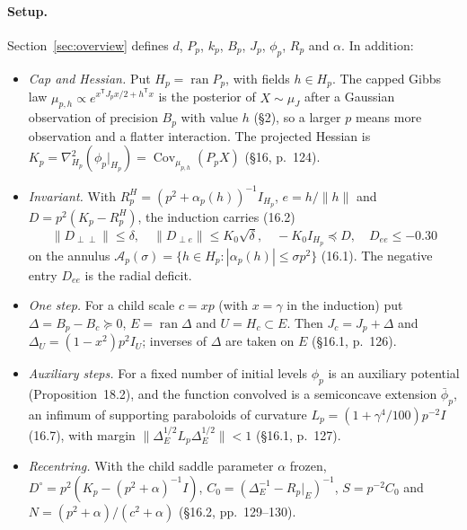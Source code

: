 \documentclass[11pt]{article}
\DeclareMathOperator{\Cov}{Cov}
\DeclareMathOperator{\ran}{ran}
\newcommand{\norm}[1]{\lVert #1\rVert}
\newcommand{\ploc}[2]{#1}
\begin{document}
\paragraph{Setup.}
Section~\ref{sec:overview} defines $d$, $P_p$, $k_p$, $B_p$, $J_p$,
$\phi_p$, $R_p$ and $\alpha$. In addition:
\begin{itemize}
\item \emph{Cap and Hessian.} Put $H_p=\ran P_p$, with fields $h\in H_p$. The
capped Gibbs law $\mu_{p,h}\propto e^{x^{\mathsf T}J_px/2+h^{\mathsf T}x}$ is
the posterior of $X\sim\mu_J$ after a Gaussian observation of precision
$B_p$ with value $h$ \ploc{(\S2)}{model.tex:29--41}, so a larger $p$ means
more observation and a flatter interaction. The projected Hessian is
$K_p=\nabla^2_{H_p}(\phi_p|_{H_p})=\Cov_{\mu_{p,h}}(P_pX)$
\ploc{(\S16, p.~124)}{cap-multiscale.tex:17--23}.
\item \emph{Invariant.} With $R_p^H=(p^2+\alpha_p(h))^{-1}I_{H_p}$,
$e=h/\norm h$ and $D=p^2(K_p-R_p^H)$, the induction carries
\ploc{(16.2)}{cap-multiscale.tex:40--45}
\[
 \norm{D_{\perp\perp}}\le\delta,\quad
 \norm{D_{\perp e}}\le K_0\sqrt\delta,\quad
 -K_0I_{H_p}\preceq D,\quad D_{ee}\le-0.30
\]
on the annulus $\mathcal A_p(\sigma)=\{h\in H_p:|\alpha_p(h)|\le\sigma p^2\}$
\ploc{(16.1)}{cap-multiscale.tex:8--12}. The negative entry $D_{ee}$ is the
radial deficit.
\item \emph{One step.} For a child scale $c=xp$ (with $x=\gamma$ in the
induction) put $\Delta=B_p-B_c\succeq0$, $E=\ran\Delta$ and $U=H_c\subset E$.
Then $J_c=J_p+\Delta$ and $\Delta_U=(1-x^2)p^2I_U$; inverses of $\Delta$ are
taken on $E$ \ploc{(\S16.1, p.~126)}{cap-multiscale.tex:143--152}.
\item \emph{Auxiliary steps.} For a fixed number of initial levels $\phi_p$ is
an auxiliary potential \ploc{(Proposition~18.2)}{cap-initialization.tex:479--486},
and the function convolved is a semiconcave extension $\bar\phi_p$, an infimum
of supporting paraboloids of curvature $L_p=(1+\gamma^4/100)p^{-2}I$
\ploc{(16.7)}{cap-multiscale.tex:248--262}, with margin
$\norm{\Delta_E^{1/2}L_p\Delta_E^{1/2}}<1$
\ploc{(\S16.1, p.~127)}{cap-multiscale.tex:264--269}.
\item \emph{Recentring.} With the child saddle parameter $\alpha$ frozen,
$D^\circ=p^2(K_p-(p^2+\alpha)^{-1}I)$, $C_0=(\Delta_E^{-1}-R_p|_E)^{-1}$,
$S=p^{-2}C_0$ and $N=(p^2+\alpha)/(c^2+\alpha)$
\ploc{(\S16.2, pp.~129--130)}{cap-multiscale.tex:402--403, 445--474}.
\end{itemize}
\end{document}
